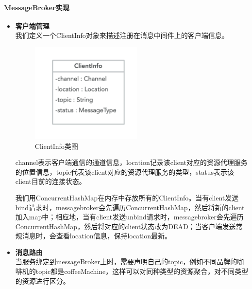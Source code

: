 \documentclass[a4paper]{article}
\theoremstyle{definition}
\begin{document}
\paragraph{MessageBroker实现}
\begin{itemize}
    \item {\textbf{客户端管理}}\\
    我们定义一个ClientInfo对象来描述注册在消息中间件上的客户端信息。
    
    \begin{figure}[ht]
    \centering
    \includegraphics[height=5cm]{images/channelInfo.jpg}
    \caption{ClientInfo类图}
    \label{fig:singleblock}
    \end{figure}
    
    channel表示客户端通信的通道信息，location记录该client对应的资源代理服务的位置信息，topic代表该client对应的资源代理服务的类型，status表示该client目前的连接状态。
    
    我们用ConcurrentHashMap在内存中存放所有的ClientInfo。当有client发送bind请求时，messagebroker会先遍历ConcurrentHashMap，然后将新的client加入map中；相应地，当有client发送unbind请求时，messagebroker会先遍历ConcurrentHashMap，然后将对应的client状态改为DEAD；当客户端发送常规消息时，会查看location信息，保持location最新。
    \item {\textbf{消息路由}}\\
    当服务绑定到messageBroker上时，需要声明自己的topic，例如不同品牌的咖啡机的topic都是coffeeMachine，这样可以对同种类型的资源聚合，对不同类型的资源进行区分。
\end{itemize}
\end{document}
